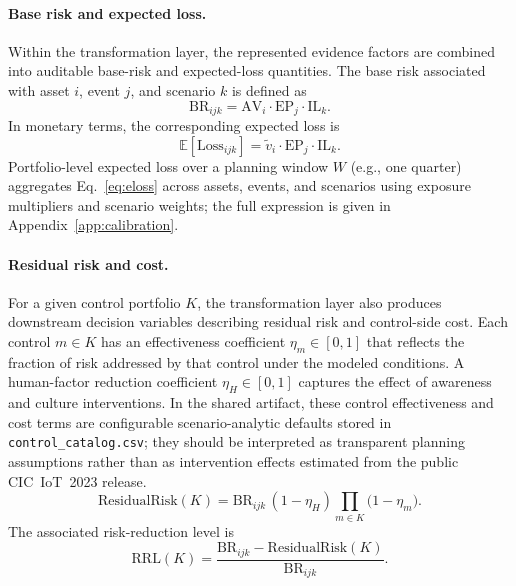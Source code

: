 \documentclass[preprint,12pt]{elsarticle}
\begin{document}
\paragraph{Base risk and expected loss.}
Within the transformation layer, the represented evidence factors are combined into auditable base-risk and expected-loss quantities. The base risk associated with asset $i$, event $j$, and scenario $k$ is defined as
\begin{equation}
  \mathrm{BR}_{ijk} =
      \mathrm{AV}_i \cdot \mathrm{EP}_j \cdot \mathrm{IL}_k.
  \label{eq:br}
\end{equation}
In monetary terms, the corresponding expected loss is
\begin{equation}
  \mathbb{E}[\mathrm{Loss}_{ijk}] = \tilde v_i \cdot \mathrm{EP}_j \cdot \mathrm{IL}_k.
  \label{eq:eloss}
\end{equation}
Portfolio-level expected loss over a planning window $W$ (e.g., one quarter) aggregates Eq.~\eqref{eq:eloss} across assets, events, and scenarios using exposure multipliers and scenario weights; the full expression is given in Appendix~\ref{app:calibration}.

\paragraph{Residual risk and cost.}
For a given control portfolio $K$, the transformation layer also produces downstream decision variables describing residual risk and control-side cost. Each control $m \in K$ has an effectiveness coefficient $\eta_m \in [0,1]$ that reflects the fraction of risk addressed by that control under the modeled conditions. A human-factor reduction coefficient $\eta_H \in [0,1]$ captures the effect of awareness and culture interventions. In the shared artifact, these control effectiveness and cost terms are configurable scenario-analytic defaults stored in \texttt{control\_catalog.csv}; they should be interpreted as transparent planning assumptions rather than as intervention effects estimated from the public CIC~IoT~2023 release.
\begin{equation}
  \mathrm{ResidualRisk}(K) =
      \mathrm{BR}_{ijk}\,(1-\eta_H)
      \prod_{m \in K}\!\bigl(1-\eta_m\bigr).
  \label{eq:resrisk}
\end{equation}
The associated risk-reduction level is
\begin{equation}
  \mathrm{RRL}(K) =
      \frac{\mathrm{BR}_{ijk} - \mathrm{ResidualRisk}(K)}
           {\mathrm{BR}_{ijk}}.
  \label{eq:rrl}
\end{equation}
\end{document}
